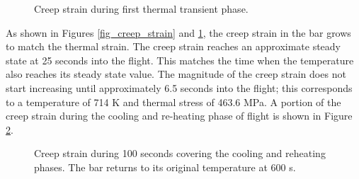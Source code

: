 \documentclass[conf]{new-aiaa}
\begin{document}
\begin{figure}[H]
  \centering
  \caption{ Creep strain during first thermal transient phase.}
  \label{fig_takeoff_creep_strain}
\end{figure}

As shown in Figures \ref{fig_creep_strain}
and \ref{fig_takeoff_creep_strain}, the creep strain in the bar 
grows to match the thermal strain. 
The creep strain reaches an approximate steady state 
at 25 seconds into the flight. 
This matches the time when the temperature also reaches
its steady state value.
The magnitude of the creep strain does not start increasing
until approximately 6.5 seconds into the flight;
this corresponds to a temperature of 714 K
and thermal stress of 463.6 MPa.
A portion of the creep strain during the cooling and re-heating
phase of flight is shown in Figure \ref{fig_touchdown_creep_strain}.

\begin{figure}[H]
  \centering
  \caption{ Creep strain during 100 seconds covering the cooling and reheating phases.
            The bar returns to its original temperature at 600 s.}
  \label{fig_touchdown_creep_strain}
\end{figure}
\end{document}
